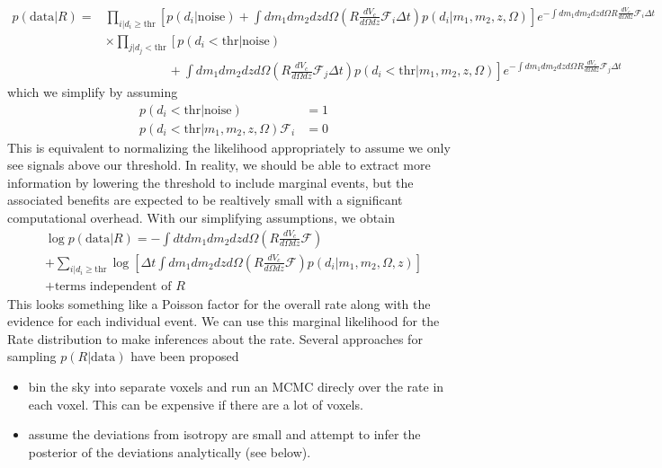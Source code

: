 \documentclass{article}
\begin{document}
\begin{align}
    p(\mathrm{data}|R) = & \prod\limits_{i|d_i\geq\mathrm{thr}} \left[ p(d_i|\mathrm{noise}) + \int dm_1 dm_2 dz d\Omega \left( R\frac{dV_c}{d\Omega dz} \mathcal{F}_i \Delta t \right) p(d_i|m_1, m_2, z, \Omega) \right] e^{-\int dm_1 dm_2 dz d\Omega R\frac{dV_c}{d\Omega dz} \mathcal{F}_i \Delta t} \nonumber \\
                         & \times \prod\limits_{j|d_j<\mathrm{thr}} \left[ p(d_i<\mathrm{thr}|\mathrm{noise}) \right. \nonumber \\
                         & \quad \quad \quad \quad \quad + \left. \int dm_1 dm_2 dz d\Omega \left( R\frac{dV_c}{d\Omega dz} \mathcal{F}_j \Delta t \right) p(d_i<\mathrm{thr}|m_1, m_2, z, \Omega) \right] e^{-\int dm_1 dm_2 dz d\Omega R\frac{dV_c}{d\Omega dz} \mathcal{F}_j \Delta t}
\end{align}
which we simplify by assuming
\begin{align}
    p(d_i<\mathrm{thr}|\mathrm{noise}) & = 1 \\
    p(d_i<\mathrm{thr}|m_1, m_2, z, \Omega)\mathcal{F}_i & = 0
\end{align}
This is equivalent to normalizing the likelihood appropriately to assume we only see signals above our threshold. 
In reality, we should be able to extract more information by lowering the threshold to include marginal events, but the associated benefits are expected to be realtively small with a significant computational overhead.
With our simplifying assumptions, we obtain
\begin{multline}
    \log p(\mathrm{data}|R) = - \int dt dm_1 dm_2 dz d\Omega \left(R \frac{dV_c}{d\Omega dz} \mathcal{F}\right) \\
         + \sum\limits_{i|d_i\geq\mathrm{thr}} \log \left[ \Delta t \int dm_1 dm_2 dz d\Omega \left(R \frac{dV_c}{d\Omega dz} \mathcal{F}\right) p(d_i|m_1, m_2, \Omega, z) \right] \\
         + \text{terms independent of }R
\end{multline}
This looks something like a Poisson factor for the overall rate along with the evidence for each individual event.
We can use this marginal likelihood for the Rate distribution to make inferences about the rate.
Several approaches for sampling $p(R|\mathrm{data})$ have been proposed
\begin{itemize}
    \item bin the sky into separate voxels and run an MCMC direcly over the rate in each voxel. This can be expensive if there are a lot of voxels.
    \item assume the deviations from isotropy are small and attempt to infer the posterior of the deviations analytically (see below).
\end{itemize}
\end{document}
